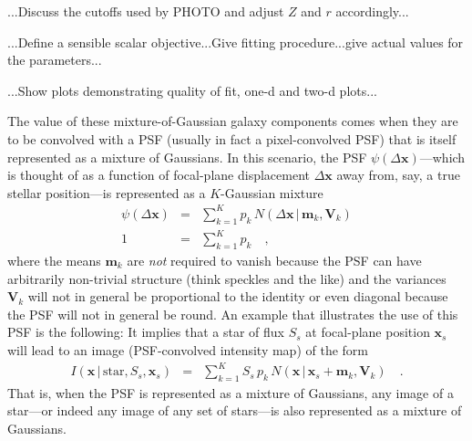 \documentclass[12pt]{article}
\newcommand{\tmatrix}[1]{\boldsymbol{#1}}
\newcommand{\tvector}[1]{\boldsymbol{#1}}
\newcommand{\pos}{\tvector{x}}
\newcommand{\mean}{\tvector{m}}
\newcommand{\var}{\tmatrix{V}\!}
\newcommand{\normal}{N}
\newcommand{\given}{\,|\,}
\renewcommand{\star}{\mathrm{star}}
\begin{document}
...Discuss the cutoffs used by PHOTO and adjust $Z$ and $r$ accordingly...

...Define a sensible scalar objective...Give fitting procedure...give actual values for the parameters...

...Show plots demonstrating quality of fit, one-d and two-d plots...

The value of these mixture-of-Gaussian galaxy components comes when
they are to be convolved with a PSF (usually in fact a pixel-convolved
PSF) that is itself represented as a mixture of Gaussians.  In this
scenario, the PSF $\psi(\Delta\pos)$---which is thought of as a
function of focal-plane displacement $\Delta\pos$ away from, say, a
true stellar position---is represented as a $K$-Gaussian mixture
\begin{eqnarray}\displaystyle
\psi(\Delta\pos) &=& \sum_{k=1}^K p_k\,\normal(\Delta\pos\given\mean_k,\var_k)
\\
1 &=& \sum_{k=1}^K p_k
\quad ,
\end{eqnarray}
where the means $\mean_k$ are \emph{not} required to vanish because
the PSF can have arbitrarily non-trivial structure (think speckles and
the like) and the variances $\var_k$ will not in general be
proportional to the identity or even diagonal because the PSF will not
in general be round.  An example that illustrates the use of this PSF
is the following: It implies that a star of flux $S_s$ at focal-plane
position $\pos_s$ will lead to an image (PSF-convolved intensity map)
of the form
\begin{eqnarray}\displaystyle
I(\pos\given\star,S_s,\pos_s) &=& \sum_{k=1}^K S_s\,p_k\,\normal(\pos\given\pos_s+\mean_k,\var_k)
\quad .
\end{eqnarray}
That is, when the PSF is represented as a mixture of Gaussians, any
image of a star---or indeed any image of any set of stars---is also
represented as a mixture of Gaussians.
\end{document}
